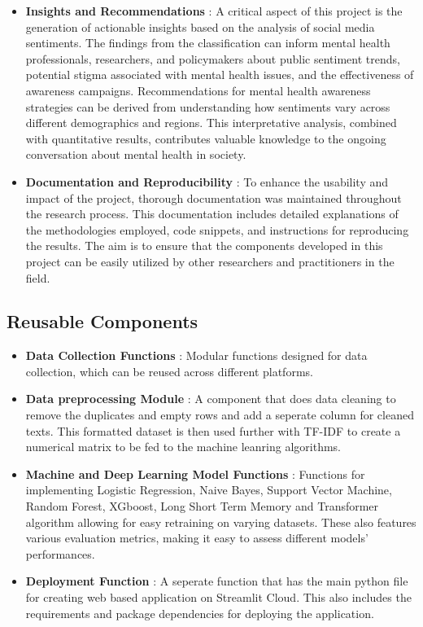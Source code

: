 \begin{itemize}
    \item \textbf{Insights and Recommendations} :
    \noindent
    A critical aspect of this project is the generation of actionable insights based on the analysis of social media sentiments. The findings from the classification can inform mental health professionals, researchers, and policymakers about public sentiment trends, potential stigma associated with mental health issues, and the effectiveness of awareness campaigns. Recommendations for mental health awareness strategies can be derived from understanding how sentiments vary across different demographics and regions. This interpretative analysis, combined with quantitative results, contributes valuable knowledge to the ongoing conversation about mental health in society.
    \item \textbf{Documentation and Reproducibility} :
    \noindent
    To enhance the usability and impact of the project, thorough documentation was maintained throughout the research process. This documentation includes detailed explanations of the methodologies employed, code snippets, and instructions for reproducing the results. The aim is to ensure that the components developed in this project can be easily utilized by other researchers and practitioners in the field.
\end{itemize}

\subsection{Reusable Components}
\begin{itemize}
    \item \textbf{Data Collection Functions} :
    \noindent
    Modular functions designed for data collection, which can be reused across different platforms.
    \item \textbf{Data preprocessing Module} :
    \noindent
    A component that does data cleaning to remove the duplicates and empty rows and add a seperate column for cleaned texts. This formatted dataset is then used further with TF-IDF to create a numerical matrix to be fed to the machine leanring algorithms.
    \item \textbf{Machine and Deep Learning Model Functions} :
    \noindent
    Functions for implementing Logistic Regression, Naive Bayes, Support Vector Machine, Random Forest, XGboost, Long Short Term Memory and Transformer algorithm allowing for easy retraining on varying datasets. These also features various evaluation metrics, making it easy to assess different models' performances.
    \item \textbf{Deployment Function} :
    \noindent
    A seperate function that has the main python file for creating web based application on Streamlit Cloud. This also includes the requirements and package dependencies for deploying the application.
\end{itemize}


